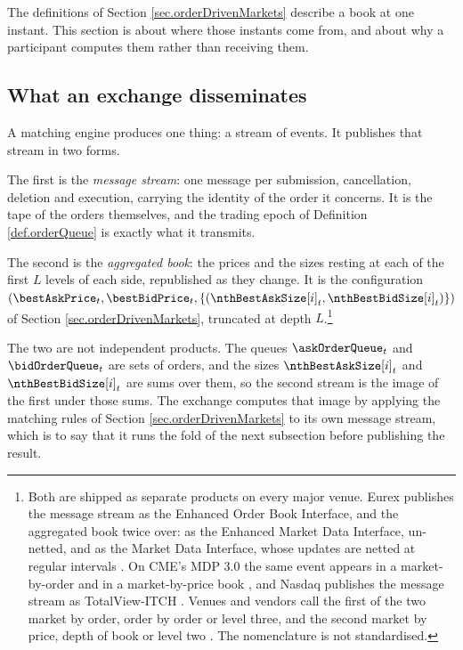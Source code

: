 The definitions of Section \ref{sec.orderDrivenMarkets} describe a book at one instant.
This section is about where those instants come from,
and about why a participant computes them rather than receiving them.

\subsection{What an exchange disseminates}

A matching engine produces one thing: a stream of events.
It publishes that stream in two forms.

The first is the \emph{message stream}:
one message per submission, cancellation, deletion and execution,
carrying the identity of the order it concerns.
It is the tape of the orders themselves,
and the trading epoch of Definition \ref{def.orderQueue} is exactly what it transmits.

The second is the \emph{aggregated book}:
the prices and the sizes resting at each of the first $L$ levels of each side,
republished as they change.
It is the configuration
$(\bestAskPrice_t, \bestBidPrice_t, \lbrace(\nthBestAskSize[i]_t, \nthBestBidSize[i]_t)\rbrace)$
of Section \ref{sec.orderDrivenMarkets}, truncated at depth $L$.\footnote{
Both are shipped as separate products on every major venue.
Eurex publishes the message stream as the Enhanced Order Book Interface,
and the aggregated book twice over:
as the Enhanced Market Data Interface, un-netted,
and as the Market Data Interface, whose updates are netted at regular intervals
\cite{DBG24eob, DBG24emd}.
On CME's MDP 3.0 the same event appears in a market-by-order and in a market-by-price book
\cite{CMEmdp, CME26mbo, CME26mbl},
and Nasdaq publishes the message stream as TotalView-ITCH \cite{NAS23itc, NAS26tot}.
Venues and vendors call the first of the two market by order, order by order or level three,
and the second market by price, depth of book or level two
\cite{B2Bmdp, ONXmdp, EPAmdp, DBNmdp, MDLitc}.
The nomenclature is not standardised.}

The two are not independent products.
The queues $\askOrderQueue_t$ and $\bidOrderQueue_t$ are sets of orders,
and the sizes $\nthBestAskSize[i]_t$ and $\nthBestBidSize[i]_t$ are sums over them,
so the second stream is the image of the first under those sums.
The exchange computes that image by applying the matching rules of
Section \ref{sec.orderDrivenMarkets} to its own message stream,
which is to say that it runs the fold of the next subsection before publishing the result.

